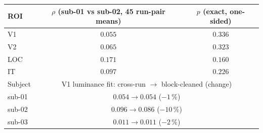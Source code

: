 \begin{tabular}{lcc}
\toprule
ROI & $\rho$ (sub-01 vs sub-02, 45 run-pair means) & $p$ (exact, one-sided) \\
\midrule
V1 & $0.055$ & $0.336$ \\
V2 & $0.065$ & $0.323$ \\
LOC & $0.171$ & $0.160$ \\
IT & $0.097$ & $0.226$ \\
\midrule
Subject & \multicolumn{2}{c}{V1 luminance fit: cross-run $\to$ block-cleaned (change)} \\
\midrule
sub-01 & \multicolumn{2}{c}{$0.054 \to 0.054$ ($-1\,\%$)} \\
sub-02 & \multicolumn{2}{c}{$0.096 \to 0.086$ ($-10\,\%$)} \\
sub-03 & \multicolumn{2}{c}{$0.011 \to 0.011$ ($-2\,\%$)} \\
\bottomrule
\end{tabular}

